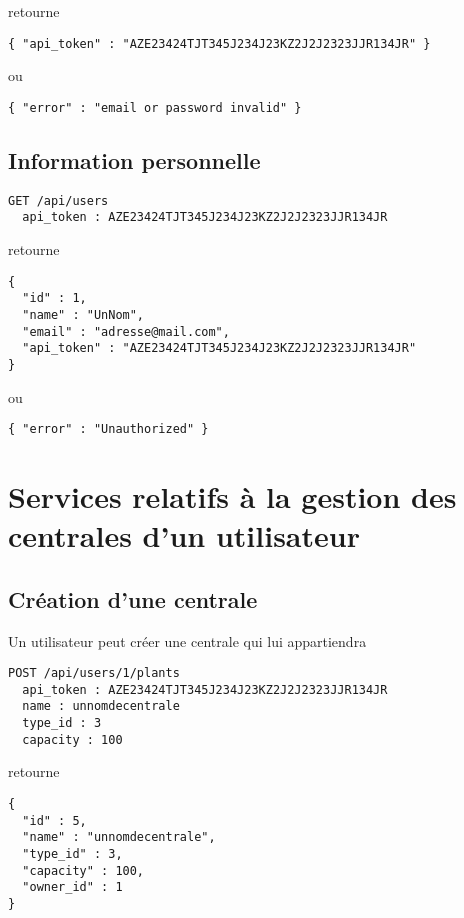 retourne

\begin{lstlisting}
{ "api_token" : "AZE23424TJT345J234J23KZ2J2J2323JJR134JR" }
\end{lstlisting}
 
ou 

\begin{lstlisting}
{ "error" : "email or password invalid" }
\end{lstlisting}

\subsection{Information personnelle}

\begin{lstlisting}
GET /api/users 
  api_token : AZE23424TJT345J234J23KZ2J2J2323JJR134JR
\end{lstlisting}

retourne

\begin{lstlisting}
{ 
  "id" : 1,
  "name" : "UnNom",
  "email" : "adresse@mail.com",
  "api_token" : "AZE23424TJT345J234J23KZ2J2J2323JJR134JR"
}
\end{lstlisting}
 
ou 

\begin{lstlisting}
{ "error" : "Unauthorized" }
\end{lstlisting}

\section{Services relatifs à la gestion des centrales d'un utilisateur}

\subsection{Création d'une centrale}
Un utilisateur peut créer une centrale qui lui appartiendra

\begin{lstlisting}
POST /api/users/1/plants
  api_token : AZE23424TJT345J234J23KZ2J2J2323JJR134JR
  name : unnomdecentrale
  type_id : 3
  capacity : 100
\end{lstlisting}

retourne

\begin{lstlisting}
{ 
  "id" : 5,
  "name" : "unnomdecentrale",
  "type_id" : 3,
  "capacity" : 100,
  "owner_id" : 1
}
\end{lstlisting}
 
